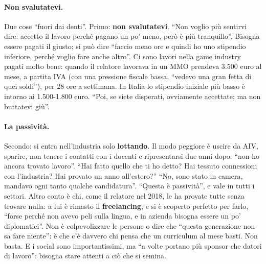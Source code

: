 \paragraph{Non svalutatevi.} Due cose ``fuori dai denti''. Primo: \textbf{non
svalutatevi}. ``Non voglio più sentirvi dire: accetto il lavoro perché pagano un
po' meno, però è più tranquillo''. Bisogna essere pagati il giusto; si può dire
``faccio meno ore e quindi ho uno stipendio inferiore, perché voglio fare anche
altro''. Ci sono lavori nella game industry pagati molto bene: quando il
relatore lavorava in un MMO prendeva 3.500 euro al mese, a partita IVA (con una
pressione fiscale bassa, ``vedevo una gran fetta di quei soldi''), per 28 ore a
settimana. In Italia lo stipendio iniziale più basso è intorno ai 1.500-1.800
euro. ``Poi, se siete disperati, ovviamente accettate; ma non buttatevi giù''.

\paragraph{La passività.} Secondo: si entra nell'industria solo
\textbf{lottando}. Il modo peggiore è uscire da AIV, sparire, non tenere i
contatti con i docenti e ripresentarsi due anni dopo: ``non ho ancora trovato
lavoro''. ``Hai fatto quello che ti ho detto? Hai tessuto connessioni con
l'industria? Hai provato un anno all'estero?'' ``No, sono stato in camera,
mandavo ogni tanto qualche candidatura''. ``Questa è passività'', e vale in
tutti i settori. Altro conto è chi, come il relatore nel 2018, le ha provate
tutte senza trovare nulla: a lui è rimasto il \textbf{freelancing}, e si è
scoperto perfetto per farlo, ``forse perché non avevo peli sulla lingua, e in
azienda bisogna essere un po' diplomatici''. Non è colpevolizzare le persone o
dire che ``questa generazione non sa fare niente'': è che c'è davvero chi pensa
che un curriculum al mese basti. Non basta. E i social sono importantissimi, ma
``a volte portano più sponsor che datori di lavoro'': bisogna stare attenti a ciò
che si semina.

